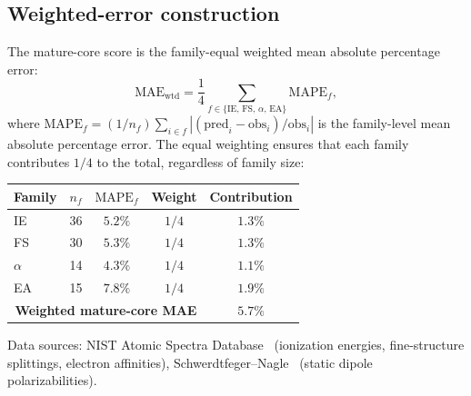 \documentclass[11pt,a4paper]{article}
\begin{document}
\subsection{Weighted-error construction}

The mature-core score is the family-equal weighted mean absolute percentage error:
\[
\mathrm{MAE}_{\mathrm{wtd}}
= \frac{1}{4} \sum_{f \in \{\mathrm{IE},\,\mathrm{FS},\,\alpha,\,\mathrm{EA}\}} \mathrm{MAPE}_f,
\]
where $\mathrm{MAPE}_f = (1/n_f) \sum_{i \in f} |(\mathrm{pred}_i - \mathrm{obs}_i)/\mathrm{obs}_i|$ is the family-level mean absolute percentage error. The equal weighting ensures that each family contributes $1/4$ to the total, regardless of family size:

\begin{center}
\small
\renewcommand{\arraystretch}{1.15}
\begin{tabular}{lcccc}
\toprule
Family & $n_f$ & $\mathrm{MAPE}_f$ & Weight & Contribution \\
\midrule
IE & 36 & $5.2\%$ & $1/4$ & $1.3\%$ \\
FS & 30 & $5.3\%$ & $1/4$ & $1.3\%$ \\
$\alpha$ & 14 & $4.3\%$ & $1/4$ & $1.1\%$ \\
EA & 15 & $7.8\%$ & $1/4$ & $1.9\%$ \\
\midrule
\multicolumn{4}{r}{\textbf{Weighted mature-core MAE}} & $\mathbf{5.7\%}$ \\
\bottomrule
\end{tabular}
\end{center}

Data sources: NIST Atomic Spectra Database~\cite{NIST_ASD} (ionization energies, fine-structure splittings, electron affinities), Schwerdtfeger--Nagle~\cite{Schwerdtfeger2019} (static dipole polarizabilities).
\end{document}
